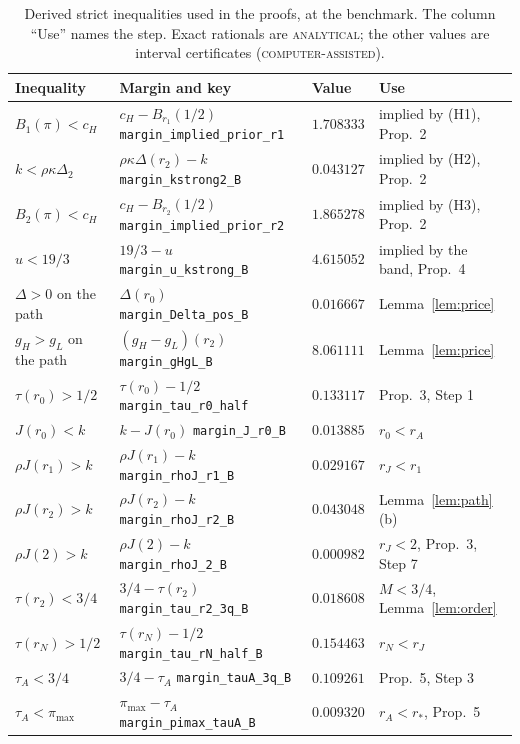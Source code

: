\documentclass[11pt]{article}
\theoremstyle{definition}
\newcommand{\lab}[1]{\textsc{#1}}
\begin{document}
\begin{table}[h]
\centering
\caption{Derived strict inequalities used in the proofs, at the benchmark. The column ``Use'' names the step.
Exact rationals are \lab{analytical}; the other values are interval certificates (\lab{computer-assisted}).}
\label{tab:derived}
\small
\begin{tabular}{@{}llll@{}}
\toprule
Inequality & Margin and key & Value & Use\\
\midrule
$B_1(\pi)<c_H$ & $c_H-B_{r_1}(1/2)$ \hfill\texttt{margin\_implied\_prior\_r1} & $1.708333$ & implied by (H1), Prop.~2\\
$k<\rho\kappa\Delta_2$ & $\rho\kappa\Delta(r_2)-k$ \hfill\texttt{margin\_kstrong2\_B} & $0.043127$ & implied by (H2), Prop.~2\\
$B_2(\pi)<c_H$ & $c_H-B_{r_2}(1/2)$ \hfill\texttt{margin\_implied\_prior\_r2} & $1.865278$ & implied by (H3), Prop.~2\\
$u<19/3$ & $19/3-u$ \hfill\texttt{margin\_u\_kstrong\_B} & $4.615052$ & implied by the band, Prop.~4\\
\midrule
$\Delta>0$ on the path & $\Delta(r_0)$ \hfill\texttt{margin\_Delta\_pos\_B} & $0.016667$ & Lemma~\ref{lem:price}\\
$g_H>g_L$ on the path & $(g_H-g_L)(r_2)$ \hfill\texttt{margin\_gHgL\_B} & $8.061111$ & Lemma~\ref{lem:price}\\
$\tau(r_0)>1/2$ & $\tau(r_0)-1/2$ \hfill\texttt{margin\_tau\_r0\_half} & $0.133117$ & Prop.~3, Step 1\\
$J(r_0)<k$ & $k-J(r_0)$ \hfill\texttt{margin\_J\_r0\_B} & $0.013885$ & $r_0<r_A$\\
$\rho J(r_1)>k$ & $\rho J(r_1)-k$ \hfill\texttt{margin\_rhoJ\_r1\_B} & $0.029167$ & $r_J<r_1$\\
$\rho J(r_2)>k$ & $\rho J(r_2)-k$ \hfill\texttt{margin\_rhoJ\_r2\_B} & $0.043048$ & Lemma~\ref{lem:path}(b)\\
$\rho J(2)>k$ & $\rho J(2)-k$ \hfill\texttt{margin\_rhoJ\_2\_B} & $0.000982$ & $r_J<2$, Prop.~3, Step 7\\
$\tau(r_2)<3/4$ & $3/4-\tau(r_2)$ \hfill\texttt{margin\_tau\_r2\_3q\_B} & $0.018608$ & $M<3/4$, Lemma~\ref{lem:order}\\
$\tau(r_N)>1/2$ & $\tau(r_N)-1/2$ \hfill\texttt{margin\_tau\_rN\_half\_B} & $0.154463$ & $r_N<r_J$\\
$\tau_A<3/4$ & $3/4-\tau_A$ \hfill\texttt{margin\_tauA\_3q\_B} & $0.109261$ & Prop.~5, Step 3\\
$\tau_A<\pi_{\max}$ & $\pi_{\max}-\tau_A$ \hfill\texttt{margin\_pimax\_tauA\_B} & $0.009320$ & $r_A<r_*$, Prop.~5\\

\end{tabular}
\end{table}
\end{document}
